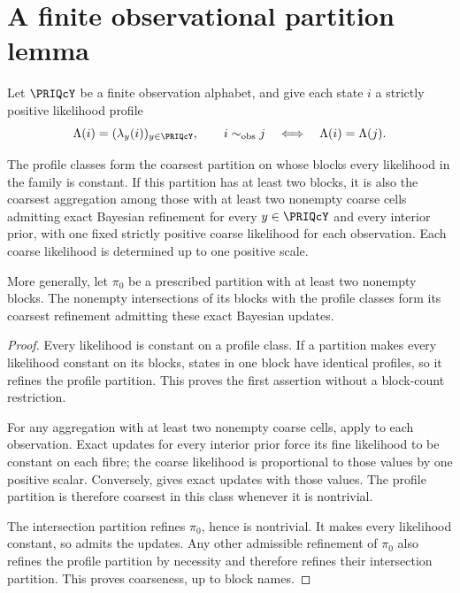 \documentclass[11pt,oneside,openany]{book}
\numberwithin{equation}{section}
\begin{document}
\section{A finite observational partition lemma}\label{PRIQ:app:observation-partition}
Let $\PRIQcY$ be a finite observation alphabet, and give each state $i$ a strictly positive likelihood profile
\[
\Lambda(i)=(\lambda_y(i))_{y\in\PRIQcY},\qquad
i\sim_{\mathrm{obs}}j\quad\Longleftrightarrow\quad\Lambda(i)=\Lambda(j).
\]
\begin{PRIQproposition}\label{PRIQ:prop:coarsest-observation-partition}
The profile classes form the coarsest partition on whose blocks every likelihood in the family is constant. If this partition has at least two blocks, it is also the coarsest aggregation among those with at least two nonempty coarse cells admitting exact Bayesian refinement for every $y\in\PRIQcY$ and every interior prior, with one fixed strictly positive coarse likelihood for each observation. Each coarse likelihood is determined up to one positive scale.

More generally, let $\pi_0$ be a prescribed partition with at least two nonempty blocks. The nonempty intersections of its blocks with the profile classes form its coarsest refinement admitting these exact Bayesian updates.
\end{PRIQproposition}
\begin{proof}
Every likelihood is constant on a profile class. If a partition makes every likelihood constant on its blocks, states in one block have identical profiles, so it refines the profile partition. This proves the first assertion without a block-count restriction.

For any aggregation with at least two nonempty coarse cells, apply  to each observation. Exact updates for every interior prior force its fine likelihood to be constant on each fibre; the coarse likelihood is proportional to those values by one positive scalar. Conversely,  gives exact updates with those values. The profile partition is therefore coarsest in this class whenever it is nontrivial.

The intersection partition refines $\pi_0$, hence is nontrivial. It makes every likelihood constant, so admits the updates. Any other admissible refinement of $\pi_0$ also refines the profile partition by necessity and therefore refines their intersection partition. This proves coarseness, up to block names.
\end{proof}
\end{document}
